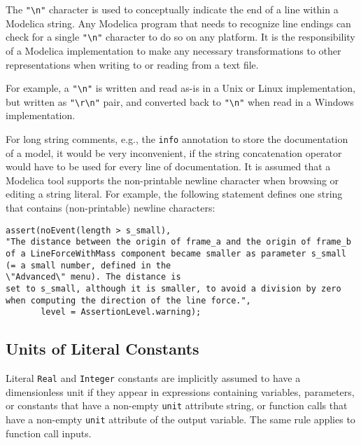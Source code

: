 The \lstinline!"\n"! character is used to conceptually indicate the
end of a line within a Modelica string. Any Modelica program that needs
to recognize line endings can check for a single \lstinline!"\n"!
character to do so on any platform. It is the responsibility of a
Modelica implementation to make any necessary transformations to other
representations when writing to or reading from a text file.

\begin{nonnormative}
For example, a \lstinline!"\n"! is written and read as-is in a Unix or Linux implementation, but written as
\lstinline!"\r\n"! pair, and converted back to \lstinline!"\n"! when read in a Windows implementation.
\end{nonnormative}

\begin{nonnormative}
For long string comments, e.g., the \lstinline!info! annotation to
store the documentation of a model, it would be very inconvenient, if
the string concatenation operator would have to be used for every line
of documentation. It is assumed that a Modelica tool supports the
non-printable newline character when browsing or editing a string
literal. For example, the following statement defines one string that
contains (non-printable) newline characters:
\begin{lstlisting}[language=modelica]
assert(noEvent(length > s_small),
"The distance between the origin of frame_a and the origin of frame_b
of a LineForceWithMass component became smaller as parameter s_small
(= a small number, defined in the
\"Advanced\" menu). The distance is
set to s_small, although it is smaller, to avoid a division by zero
when computing the direction of the line force.",
       level = AssertionLevel.warning);
\end{lstlisting}
\end{nonnormative}

\subsection{Units of Literal Constants}\label{units-literal-constants}

Literal \lstinline!Real! and \lstinline!Integer! constants are implicitly assumed to have a dimensionless unit if they appear in expressions containing variables, parameters, or constants that have a non-empty \lstinline!unit! attribute string, or function calls that have a non-empty \lstinline!unit! attribute of the output variable. The same rule applies to function call inputs.

